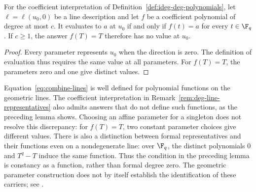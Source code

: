 \begin{lemma}
	\label{lem:combine-map-singleton-evaluation}
	\leanok
	For the coefficient interpretation of
	Definition~\ref{def:ideg-deg-polynomials}, let $\ell=\ell(u_0,0)$ be a
	line description and let $f$ be a coefficient polynomial of degree at
	most $c$. It evaluates to $a$ at $u_0$ if and only if
	$f(t)=a$ for every $t\in\F_q$. If $c\geq1$, the answer $f(T)=T$
	therefore has no value at $u_0$.
\end{lemma}
\begin{proof}
	\leanok
	Every parameter represents $u_0$ when the direction is zero. The
	definition of evaluation thus requires the same value at all
	parameters. For $f(T)=T$, the parameters zero and one give distinct
	values.
\end{proof}

\begin{remark}
	\label{rem:combine-map-function-domain}
	Equation~\eqref{eq:combine-lines} is well defined for polynomial
	functions on the geometric lines. The coefficient interpretation in
	Remark~\ref{rem:deg-line-representatives} also admits answers that do
	not define such functions, as the preceding lemma shows. Choosing an
	affine parameter for a singleton does not resolve this discrepancy:
	for $f(T)=T$, two constant parameter choices give different values.
	There is also a distinction between formal representatives and their
	functions even on a nondegenerate line: over $\F_q$, the distinct
	polynomials $0$ and $T^q-T$ induce the same function. Thus the condition
	in the preceding lemma is constancy as a function, rather than formal
	degree zero. The geometric parameter construction does not by itself
	establish the identification of these carriers; see
	\cite{gap:qpbt_subline-claims-line-marginal}.
\end{remark}

